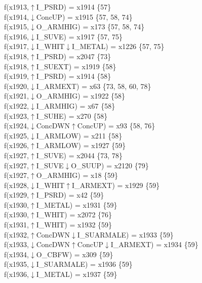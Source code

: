 f(x1913,$\uparrow$I\_PSRD) = x1914 \{57\} \\  
f(x1914,$\downarrow$ConcUP) = x1915 \{57, 58, 74\} \\  
f(x1915,$\downarrow$O\_ARMHIG) = x173 \{57, 58, 74\} \\  
f(x1916,$\downarrow$I\_SUVE) = x1917 \{57, 75\} \\  
f(x1917,$\downarrow$I\_WHIT$\downarrow$I\_METAL) = x1226 \{57, 75\} \\  
f(x1918,$\uparrow$I\_PSRD) = x2047 \{73\} \\  
f(x1918,$\uparrow$I\_SUEXT) = x1919 \{58\} \\  
f(x1919,$\uparrow$I\_PSRD) = x1914 \{58\} \\  
f(x1920,$\downarrow$I\_ARMEXT) = x63 \{73, 58, 60, 78\} \\  
f(x1921,$\downarrow$O\_ARMHIG) = x1922 \{58\} \\  
f(x1922,$\downarrow$I\_ARMHIG) = x67 \{58\} \\  
f(x1923,$\uparrow$I\_SUHE) = x270 \{58\} \\  
f(x1924,$\downarrow$ConcDWN$\uparrow$ConcUP) = x93 \{58, 76\} \\  
f(x1925,$\downarrow$I\_ARMLOW) = x211 \{58\} \\  
f(x1926,$\uparrow$I\_ARMLOW) = x1927 \{59\} \\  
f(x1927,$\uparrow$I\_SUVE) = x2044 \{73, 78\} \\  
f(x1927,$\uparrow$I\_SUVE$\downarrow$O\_SUUP) = x2120 \{79\} \\  
f(x1927,$\uparrow$O\_ARMHIG) = x18 \{59\} \\  
f(x1928,$\downarrow$I\_WHIT$\uparrow$I\_ARMEXT) = x1929 \{59\} \\  
f(x1929,$\uparrow$I\_PSRD) = x42 \{59\} \\  
f(x1930,$\uparrow$I\_METAL) = x1931 \{59\} \\  
f(x1930,$\uparrow$I\_WHIT) = x2072 \{76\} \\  
f(x1931,$\uparrow$I\_WHIT) = x1932 \{59\} \\  
f(x1932,$\uparrow$ConcDWN$\downarrow$I\_SUARMALE) = x1933 \{59\} \\  
f(x1933,$\downarrow$ConcDWN$\uparrow$ConcUP$\downarrow$I\_ARMEXT) = x1934 \{59\} \\  
f(x1934,$\downarrow$O\_CBFW) = x309 \{59\} \\  
f(x1935,$\downarrow$I\_SUARMALE) = x1936 \{59\} \\  
f(x1936,$\downarrow$I\_METAL) = x1937 \{59\} \\  
